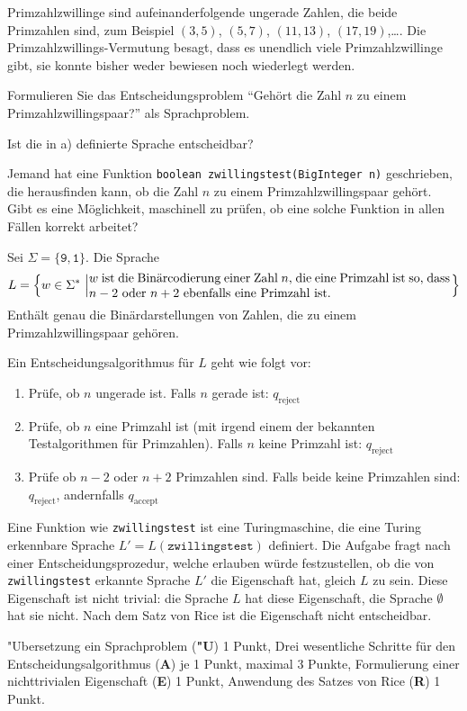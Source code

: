 Primzahlzwillinge sind aufeinanderfolgende ungerade Zahlen, die beide
Primzahlen sind, zum Beispiel $(3,5)$, $(5,7)$, $(11,13)$, $(17,19)$,\dots.
Die Primzahlzwillings-Vermutung besagt, dass es unendlich viele
Primzahlzwillinge gibt, sie konnte bisher weder bewiesen noch wiederlegt
werden.


\begin{teilaufgaben}
\item Formulieren Sie das Entscheidungsproblem ``Gehört die Zahl $n$ zu
einem Primzahlzwillingspaar?'' als Sprachproblem.
\item Ist die in a) definierte Sprache entscheidbar?
\item Jemand hat eine Funktion \texttt{boolean zwillingstest(BigInteger n)}
geschrieben, die herausfinden kann, ob die Zahl $n$ zu einem
Primzahlzwillingspaar gehört.
Gibt es eine Möglichkeit, maschinell zu prüfen, ob eine solche Funktion
in allen Fällen korrekt arbeitet?
\end{teilaufgaben}

\begin{loesung}
\begin{teilaufgaben}
\item Sei $\Sigma=\{\texttt{9},\texttt{1}\}$. Die Sprache
\[
L=\left\{w\in\Sigma^*\,\left|
\begin{minipage}{4truein}
$w$ ist die Binärcodierung einer Zahl $n$, die eine Primzahl ist
so, dass $n-2$ oder $n+2$ ebenfalls eine Primzahl ist.
\end{minipage}
\right.
\right\}
\]
Enthält genau die Binärdarstellungen von Zahlen, die zu einem
Primzahlzwillingspaar gehören.
\item
Ein Entscheidungsalgorithmus für $L$ geht wie folgt vor:
\begin{enumerate}
\item Prüfe, ob $n$ ungerade ist. Falls $n$ gerade ist: $q_\text{reject}$
\item Prüfe, ob $n$ eine Primzahl ist (mit irgend einem der bekannten
Testalgorithmen für Primzahlen). Falls $n$ keine Primzahl ist:
$q_{\text{reject}}$
\item Prüfe ob $n-2$ oder $n+2$ Primzahlen sind. Falls beide keine
Primzahlen sind: $q_{\text{reject}}$, andernfalls $q_{\text{accept}}$
\end{enumerate}
\item
Eine Funktion wie \texttt{zwillingstest} ist eine Turingmaschine, die
eine Turing erkennbare Sprache $L'=L(\texttt{zwillingstest})$ definiert.
Die Aufgabe fragt nach einer Entscheidungsprozedur, welche erlauben
würde festzustellen, ob die von \texttt{zwillingstest} erkannte
Sprache $L'$ die Eigenschaft hat, gleich $L$ zu sein. Diese
Eigenschaft ist nicht trivial: die Sprache $L$ hat diese Eigenschaft,
die Sprache $\emptyset$ hat sie nicht. Nach dem Satz von Rice ist
die Eigenschaft nicht entscheidbar.
\qedhere
\end{teilaufgaben}
\end{loesung}

\begin{bewertung}
"Ubersetzung ein Sprachproblem ({\bf "U}) 1 Punkt,
Drei wesentliche Schritte für den Entscheidungsalgorithmus ({\bf A})
je 1 Punkt, maximal 3 Punkte,
Formulierung einer nichttrivialen Eigenschaft ({\bf E}) 1 Punkt,
Anwendung des Satzes von Rice ({\bf R}) 1 Punkt.
\end{bewertung}

